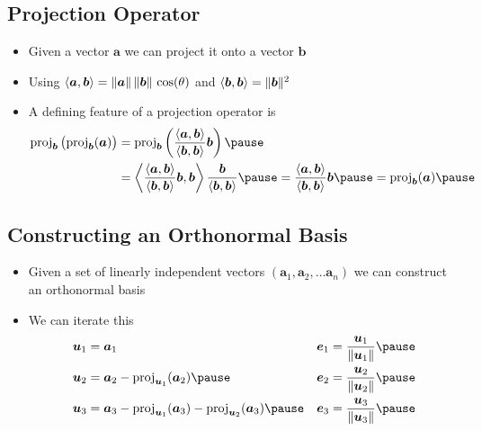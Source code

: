 \begin{slide}
\section[-2]{Projection Operator}

\pb
\begin{itemize}
\item Given a vector $\bm{a}$ we can project it onto a vector
  $\bm{b}$\pause
  \begin{center}
    \pause
  \end{center}
\item Using $\left\langle {\bm{a}}, {\bm{b}}\right\rangle = \| \bm{a} \| \, \| \bm{b} \| \,
  \cos(\theta)$ and $\left\langle {\bm{b}}, {\bm{b}}\right\rangle = \| \bm{b} \|^2$
  \pause
\item A defining feature of a projection operator is
  \begin{align*}
    \mathrm{proj}_{\bm{b}}\bra{\strut \mathrm{proj}_{\bm{b}}(\bm{a})}
    &= \mathrm{proj}_{\bm{b}}\bra{
      \frac{\inner{\bm{a}}{\bm{b}}}{\inner{\bm{b}}{\bm{b}}}
      \bm{b}}\pause\\
        &= \inner{ \frac{\inner{\bm{a}}{\bm{b}}}{\inner{\bm{b}}{\bm{b}}}
      \bm{b}}{\bm{b}} \frac{\bm{b}}{\inner{\bm{b}}{\bm{b}}}\pause
      = \frac{\inner{\bm{a}}{\bm{b}}}{\inner{\bm{b}}{\bm{b}}} \bm{b} \pause
      = \mathrm{proj}_{\bm{b}}(\bm{a})\pause
  \end{align*}
\end{itemize}


\end{slide}



\begin{slide}
\section[-2]{Constructing an Orthonormal Basis}

\pb
\begin{itemize}
\item Given a set of linearly independent vectors $(\bm{a}_1, \bm{a}_2,
  \ldots \bm{a}_n)$ we can construct an orthonormal basis\pause
  \begin{center}
    \pause
  \end{center}
\item We can iterate this
  {\small
  \begin{align*}
    \bm{u}_1 &= \bm{a}_1
    &
      \bm{e}_1&= \frac{\bm{u}_1}{\len{\bm{u}_1}}\pause\\ 
    \bm{u}_2 &= \bm{a}_2 - \mathrm{proj}_{\bm{u}_1}(\bm{a}_2)\pause
    &
      \bm{e}_2&= \frac{\bm{u}_2}{\len{\bm{u}_2}}\pause\\ 
    \bm{u}_3 &= \bm{a}_3 - \mathrm{proj}_{\bm{u}_1}(\bm{a}_3) -
                \mathrm{proj}_{\bm{u}_2}(\bm{a}_3)\pause
    &
      \bm{e}_3&= \frac{\bm{u}_3}{\len{\bm{u}_3}}\pause
  \end{align*}}
\end{itemize}

\end{slide}

